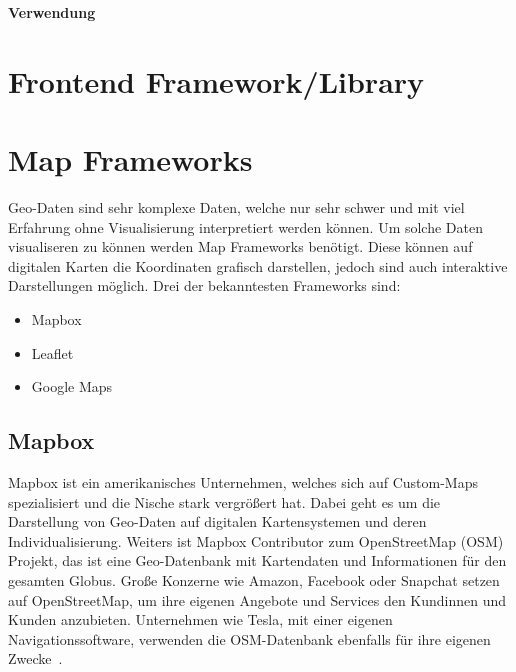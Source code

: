 \textbf{Verwendung}

\begin{center}
\end{center}

\cite{github-issue-automation}


\section{Frontend Framework/Library}
\label{sec:frontend-framework/library}



\section{Map Frameworks}
Geo-Daten sind sehr komplexe Daten, welche nur sehr schwer und mit viel Erfahrung ohne Visualisierung interpretiert werden können.
Um solche Daten visualiseren zu können werden Map Frameworks benötigt.
Diese können auf digitalen Karten die Koordinaten grafisch darstellen, jedoch sind auch interaktive Darstellungen möglich.
Drei der bekanntesten Frameworks sind:

\begin{itemize}
    \item Mapbox
    \item Leaflet
    \item Google Maps
\end{itemize}

\subsection{Mapbox}
Mapbox ist ein amerikanisches Unternehmen, welches sich auf Custom-Maps spezialisiert und die Nische stark vergrößert hat.
Dabei geht es um die Darstellung von Geo-Daten auf digitalen Kartensystemen und deren Individualisierung.
Weiters ist Mapbox Contributor zum OpenStreetMap (OSM) Projekt, das ist eine Geo-Datenbank mit Kartendaten und Informationen
für den gesamten Globus.
Große Konzerne wie Amazon, Facebook oder Snapchat setzen auf OpenStreetMap, um ihre eigenen Angebote und Services den Kundinnen und Kunden anzubieten.
Unternehmen wie Tesla, mit einer eigenen Navigationssoftware, verwenden die OSM-Datenbank ebenfalls für ihre eigenen Zwecke~\cite{osm-customers-1, osm-customers-2}.

